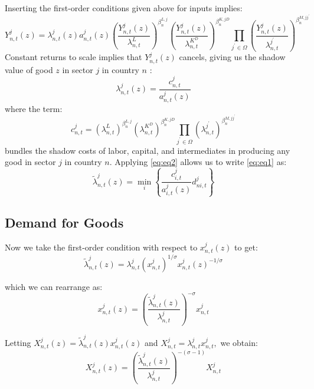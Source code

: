 \documentclass[12pt, bibtotoc, tablecaptionabove, figurecaptionabove, fleqn]{article}
\begin{document}
Inserting the first-order conditions given above for inputs implies:
\begin{equation*}
Y_{n, t}^{j}(z)=\lambda_{n, t}^{j}(z) a_{n, t}^{j}(z)\left(\frac{Y_{n, t}^{j}(z)}{\lambda_{n, t}^{L}}\right)^{\beta_{n}^{L, j}} \left(\frac{Y_{n, t}^{j}(z)}{\lambda_{n, t}^{K^D}}\right)^{\beta_{n}^{K, j D}} \prod_{j^{\prime} \in \Omega}\left(\frac{Y_{n, t}^{j}(z)}{\lambda_{n, t}^{j^{\prime}}}\right)^{\beta_{n}^{M, j j^{\prime}}}
\end{equation*}
Constant returns to scale implies that $Y_{n, t}^{j}(z)$ cancels, giving us the shadow value of good $z$ in
sector $j$ in country $n$ :
\begin{equation}\label{eq:eq2}
\lambda_{n, t}^{j}(z)=\frac{c_{n, t}^{j}}{a_{n, t}^{j}(z)}
\end{equation}
where the term:
\begin{equation*}
c_{n, t}^{j}=\left(\lambda_{n, t}^{L}\right)^{\beta_{n}^{L, j}} \left(\lambda_{n, t}^{K^{D}}\right)^{\beta_{n}^{K, j D}} \prod_{j^{\prime} \in \Omega}\left(\lambda_{n, t}^{j^{\prime}}\right)^{\beta_{n}^{M, j j^{\prime}}}
\end{equation*}
bundles the shadow costs of labor, capital, and intermediates in producing any good in sector $j$
in country $n$. Applying \ref{eq:eq2} allows us to write \ref{eq:eq1} as:
\begin{equation*}
\tilde{\lambda}_{n, t}^{j}(z)=\min _{i}\left\{\frac{c_{i, t}^{j}}{a_{i, t}^{j}(z)} d_{n i, t}^{j}\right\}
\end{equation*}



\subsection{Demand for Goods}

Now we take the first-order condition with respect to $x_{n, t}^{j}(z)$ to get:
\begin{equation*}
	\tilde{\lambda}_{n, t}^{j}(z)=\lambda_{n, t}^{j}\left(x_{n, t}^{j}\right)^{1 / \sigma} x_{n, t}^{j}(z)^{-1 / \sigma}
\end{equation*}

which we can rearrange as:
\begin{equation*}
	x_{n, t}^{j}(z)=\left(\frac{\tilde{\lambda}_{n, t}^{j}(z)}{\lambda_{n, t}^{j}}\right)^{-\sigma} x_{n, t}^{j}
\end{equation*}

Letting $X_{n, t}^{j}(z)=\tilde{\lambda}_{n, t}^{j}(z) x_{n, t}^{j}(z)$ and $X_{n, t}^{j}=\lambda_{n, t}^{j} x_{n, t}^{j},$ we obtain:
\begin{equation}\label{eq:eq3}
	X_{n, t}^{j}(z)=\left(\frac{\tilde{\lambda}_{n, t}^{j}(z)}{\lambda_{n, t}^{j}}\right)^{-(\sigma-1)} X_{n, t}^{j}
\end{equation}
\end{document}
